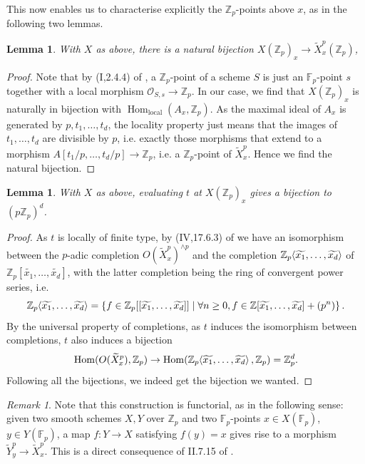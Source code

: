 \documentclass[12pt]{article}
\newcommand{\Z}{\mathbb{Z}}
\renewcommand{\O}{\mathcal{O}}
\newcommand{\F}{\mathbb{F}}
\renewcommand{\angle}[1]{\hspace{-2pt}\left\langle #1 \right\rangle}
\DeclareMathOperator{\Hom}{Hom}
\theoremstyle{plain}
\newtheorem{lem}[thm]{Lemma} %
\theoremstyle{definition}
\theoremstyle{remark}
\newtheorem{rem}[thm]{Remark} %
\begin{document}
This now enables us to characterise explicitly the $\Z_p$-points above $x$, as in the following two lemmas.

\begin{lem}
With $X$ as above, there is a natural bijection $X(\Z_p)_x \to \widetilde{X}_x^p(\Z_p)$,
\end{lem}
\begin{proof}
Note that by (I,2.4.4) of \cite{ega}, a $\Z_p$-point of a scheme $S$ is just an $\F_p$-point $s$ together with a local morphism $\O_{S,s} \to \Z_p$. In our case, we find that $X(\Z_p)_x$ is naturally in bijection with $\Hom_{\text{local}}(A_x,\Z_p)$. As the maximal ideal of $A_x$ is generated by $p,t_1,\dots,t_d$, the locality property just means that the images of $t_1,\dots,t_d$ are divisible by $p$, i.e. exactly those morphisms that extend to a morphism $A[t_1/p,\dots,t_d/p] \to \Z_p$, i.e. a $\Z_p$-point of $\widetilde{X}_x^p$. Hence we find the natural bijection.
\end{proof}

\begin{lem}
With $X$ as above, evaluating $t$ at $X(\Z_p)_x$ gives a bijection to $(p\Z_p)^d$.
\end{lem}
\begin{proof}
As $t$ is locally of finite type, by (IV,17.6.3) of \cite{ega} we have an isomorphism between the $p$-adic completion $O(\widetilde{X}_x^p)^{\wedge p}$ and the completion $\Z_p\angle{\widetilde{x_1},\dots, \widetilde{x_d}}$ of $\Z_p[\widetilde{x_1},\dots,\widetilde{x_d}]$, with the latter completion being the ring of convergent power series, i.e.
\[
\Z_p\angle{\widetilde{x_1},\dots, \widetilde{x_d}} = \left\{f \in \Z_p[[\widetilde{x_1},\dots,\widetilde{x_d}]] \mid \forall n \geq 0, f \in \Z[\widetilde{x_1},\dots,\widetilde{x_d}] + (p^n) \right\}.
\]
By the universal property of completions, as $t$ induces the isomorphism between completions, $t$ also induces a bijection $$\Hom(O(\widetilde{X}_x^p), \Z_p) \to \Hom(\Z_p\angle{\widetilde{x_1},\dots,\widetilde{x_d}},\Z_p) = \Z_p^d.$$ Following all the bijections, we indeed get the bijection we wanted.
\end{proof}

\begin{rem}
\label{rem:smoothpointsfunc}
Note that this construction is functorial, as in the following sense: given two smooth schemes $X,Y$ over $\Z_p$ and two $\F_p$-points $x\in X(\F_p)$, $y\in Y(\F_p)$, a map $f: Y \to X$ satisfying $f(y) = x$ gives rise to a morphism $\widetilde{Y}_y^p \to \widetilde{X}_x^p$. This is a direct consequence of II.7.15 of \cite{hartshorne}.
\end{rem}
\end{document}
